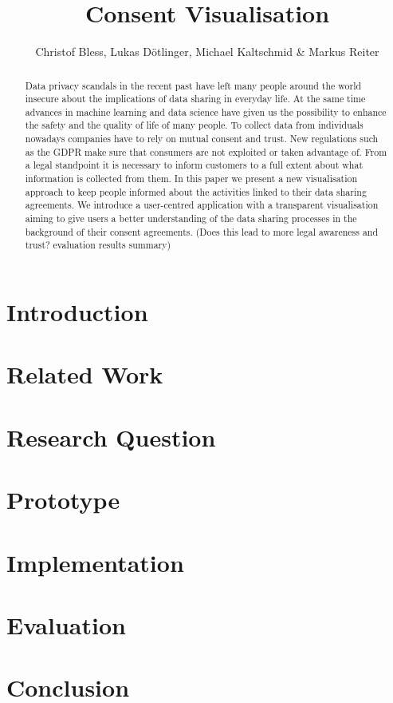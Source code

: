 \documentclass[notitlepage,11pt]{article}
\begin{document}
\title{Consent Visualisation}
\author{Christof Bless, Lukas Dötlinger, Michael Kaltschmid \& Markus Reiter}
\maketitle
\begin{abstract}
  Data privacy scandals in the recent past have left many people around the world
  insecure about the implications of data sharing in everyday life. At the
  same time advances in machine learning and data science have given us the
  possibility to enhance the safety and the quality of life of many people. To
  collect data from individuals nowadays companies have to rely on mutual
  consent and trust. New regulations such as the GDPR make sure that consumers
  are not exploited or taken advantage of. From a legal standpoint it is
  necessary to inform customers to a full extent about what information is
  collected from them. In this paper we present a new visualisation approach
  to keep people informed about the activities linked to their data sharing
  agreements. We introduce a user-centred application with a transparent
  visualisation aiming to give users a better understanding of the data sharing
  processes in the background of their consent agreements. (Does this lead to
  more legal awareness and trust? evaluation results summary)
\end{abstract}

\section{Introduction}
\label{sec:introduction}


\section{Related Work}
\label{sec:related_work}


\section{Research Question}
\label{sec:research_question}


\section{Prototype}
\label{sec:prototyping}


\section{Implementation}
\label{sec:implementation}


\section{Evaluation}
\label{sec:evaluation}


\section{Conclusion}
\label{sec:conclusion}


\newpage
\printbibliography
\end{document}
